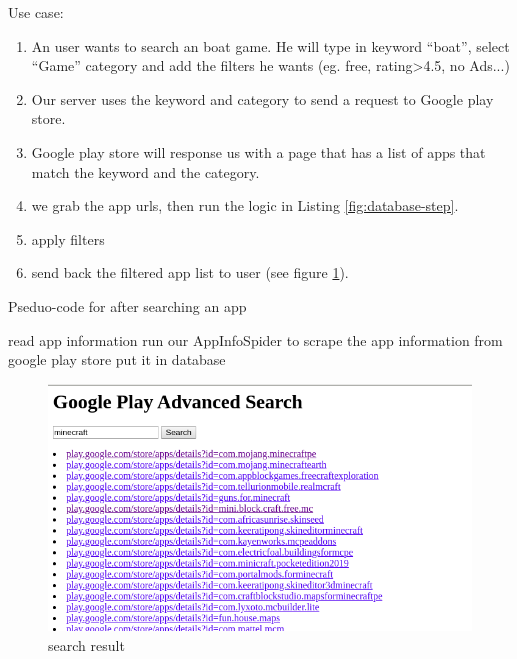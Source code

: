 \documentclass[12pt, a4paper]{article}
\begin{document}
Use case:

\begin{enumerate}
    \item An user wants to search an boat game. He will type in keyword “boat”, select “Game” category and add the filters he wants (eg. free, rating>4.5, no Ads...)
    \item Our server uses the keyword and category to send a request to Google play store.
    \item Google play store will response us with a page that has a list of apps that match the keyword and the category. 
    \item we grab the app urls, then run the logic in Listing \ref{fig:database-step}.
    \item apply filters
    \item send back the filtered app list to user (see figure  \ref{fig:search_result}).
\end{enumerate}

\begin{algorithm}
    \caption{Pseduo-code for after searching an app}
    \label{fig:database-step}
\begin{algorithmic}
    \STATE read app information
    \ELSE
    \STATE run our AppInfoSpider to scrape the app information from google play store
    \STATE put it in database
    \ENDIF
    \ENDFOR
\end{algorithmic}
\end{algorithm}
    

\begin{figure}[ht]
\centering
\includegraphics[width=1\textwidth]{homepage.png}
\caption{search result}
\label{fig:search_result}
\end{figure}
\end{document}
